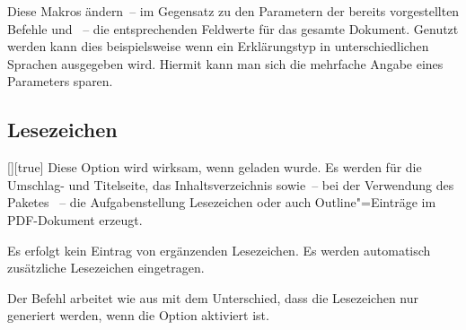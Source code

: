 \begin{Declaration}{}
\begin{Declaration}{}
\begin{Declaration}{}
\begin{Declaration}{}
\printdeclarationlist%
%
%
Diese Makros ändern~-- im Gegensatz zu den Parametern der bereits vorgestellten 
Befehle  und ~-- die entsprechenden 
Feldwerte für das gesamte Dokument. Genutzt werden kann dies beispielsweise 
wenn ein Erklärungstyp in unterschiedlichen Sprachen ausgegeben wird. Hiermit 
kann man sich die mehrfache Angabe eines Parameters sparen.
\end{Declaration}
\end{Declaration}
\end{Declaration}
\end{Declaration}


\subsection{Lesezeichen}
\begin{Declaration}{[\PBoolean]}[true]%
\printdeclarationlist%
%
%
%
%
Diese Option wird wirksam, wenn  geladen wurde. Es werden für 
die Umschlag- und Titelseite, das Inhaltsverzeichnis sowie~-- bei der 
Verwendung des Paketes ~-- die Aufgabenstellung 
Lesezeichen oder auch Outline"=Einträge im PDF-Dokument erzeugt.
%
\begin{values}
\itemfalse
  Es erfolgt kein Eintrag von ergänzenden Lesezeichen.
\itemtrue*
  Es werden automatisch zusätzliche Lesezeichen eingetragen.
\end{values}
\end{Declaration}

\begin{Declaration}{%
}%
\printdeclarationlist%
%
Der Befehl  arbeitet wie  aus 
 mit dem Unterschied, dass die Lesezeichen nur generiert 
werden, wenn die Option  aktiviert ist.
\end{Declaration}



